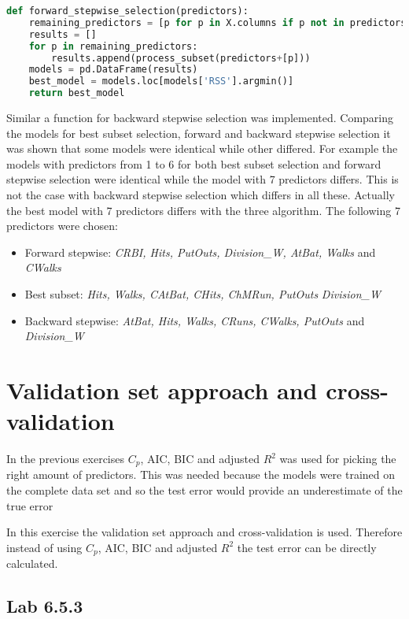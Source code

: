 \begin{lstlisting}[language=Python, label=lst:forwardselection, caption=metricsUtil for calculating Cp\, BIC and RSS]
def forward_stepwise_selection(predictors):
	remaining_predictors = [p for p in X.columns if p not in predictors]
	results = []
	for p in remaining_predictors:
		results.append(process_subset(predictors+[p]))
	models = pd.DataFrame(results)
	best_model = models.loc[models['RSS'].argmin()]
	return best_model
\end{lstlisting}

Similar a function for backward stepwise selection was implemented. Comparing the models for best subset selection, forward and backward stepwise selection it was shown that some models were identical while other differed. For example the models with predictors from 1 to 6 for both best subset selection and forward stepwise selection were identical while the model with 7 predictors differs. This is not the case with backward stepwise selection which differs in all these. Actually the best model with 7 predictors differs with the three algorithm. The following 7 predictors were chosen:

\begin{itemize}
\item Forward stepwise: \emph{CRBI, Hits, PutOuts, Division\_W, AtBat, Walks} and \emph{CWalks}
\item Best subset: \emph{Hits, Walks, CAtBat, CHits, ChMRun, PutOuts} \emph{Division\_W}
\item Backward stepwise: \emph{AtBat, Hits, Walks, CRuns, CWalks, PutOuts} and \emph{Division\_W}
\end{itemize}

\section{Validation set approach and cross-validation}
In the previous exercises $C_p$, AIC, BIC and adjusted $R^2$ was used for picking the right amount of predictors. This was needed because the models were trained on the complete data set and so the test error would provide an underestimate of the true error

In this exercise the validation set approach and cross-validation is used. Therefore instead of using $C_p$, AIC, BIC and adjusted $R^2$ the test error can be directly calculated. 
\subsection{Lab 6.5.3}


